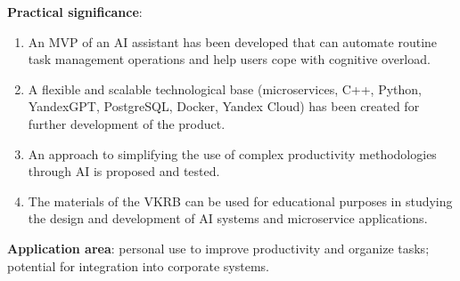 \textbf{Practical significance}:

\begin{enumerate}
\item An MVP of an AI assistant has been developed that can automate routine task management operations and help users cope with cognitive overload.

\item A flexible and scalable technological base (microservices, C++, Python, YandexGPT, PostgreSQL, Docker, Yandex Cloud) has been created for further development of the product.

\item An approach to simplifying the use of complex productivity methodologies through AI is proposed and tested.

\item The materials of the VKRB can be used for educational purposes in studying the design and development of AI systems and microservice applications.
\end{enumerate}

\textbf{Application area}: personal use to improve productivity and organize tasks; potential for integration into corporate systems.